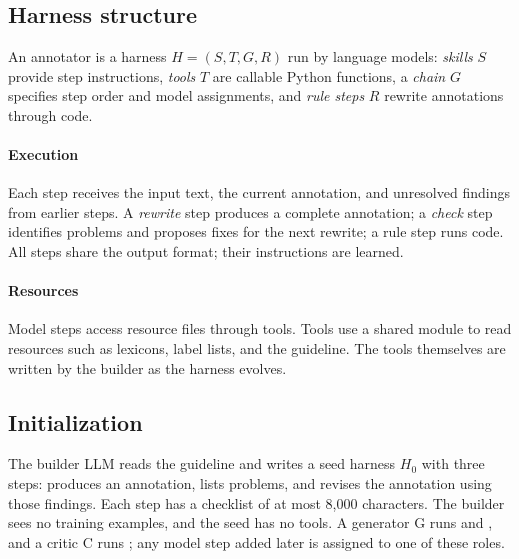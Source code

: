 \section{\sys}
\label{sec:method}



\subsection{Harness structure}
\label{sec:overview}

An annotator is a harness $H=(S,T,G,R)$ run by language models: \emph{skills} $S$ provide step instructions, \emph{tools} $T$ are callable Python functions, a \emph{chain} $G$ specifies step order and model assignments, and \emph{rule steps} $R$ rewrite annotations through code.

\paragraph{Execution} Each step receives the input text, the current annotation, and unresolved findings from earlier steps. A \emph{rewrite} step produces a complete annotation; a \emph{check} step identifies problems and proposes fixes for the next rewrite; a rule step runs code. All steps share the output format; their instructions are learned.

\paragraph{Resources} Model steps access resource files through tools. Tools use a shared module to read resources such as lexicons, label lists, and the guideline. The tools themselves are written by the builder as the harness evolves.

\subsection{Initialization}
\label{sec:seed}

The builder LLM reads the guideline and writes a seed harness $H_0$ with three steps:  produces an annotation,  lists problems, and  revises the annotation using those findings. Each step has a checklist of at most 8{,}000 characters. The builder sees no training examples, and the seed has no tools. A generator G runs  and , and a critic C runs ; any model step added later is assigned to one of these roles.

